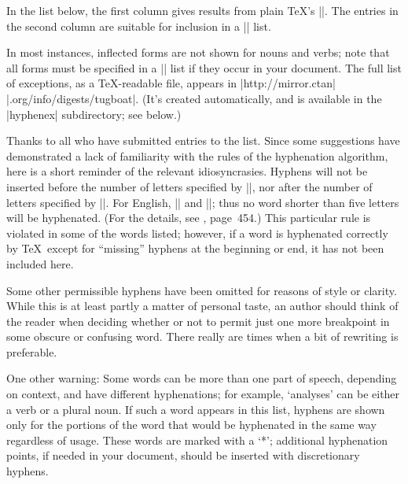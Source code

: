 In the list below, the first column gives results from plain \TeX's
||. The entries in the second column are suitable for
inclusion in a \hbox{||} list.

In most instances, inflected forms are not shown for nouns and verbs;
note that all forms must be specified in a || list
if they occur in your document.  The full list of exceptions, as a
\TeX-readable file, appears in
|http://mirror.ctan| |.org/info/digests/tugboat|.
(It's created automatically, and is available in the
|hyphenex| subdirectory; see below.)

Thanks to all who have submitted entries to the list.  Since some
suggestions have demonstrated a lack of familiarity with the rules of
the hyphenation algorithm, here is a short reminder of the relevant
idiosyncrasies.  Hyphens will not be inserted before the number of
letters specified by |\lefthyphenmin|, nor after the number of letters
specified by |\righthyphenmin|.  For  English, ||
and ||; thus no word shorter than five
letters will be hyphenated.  (For the details, see \TB, page~454.)
This particular rule is violated in some of the words listed; however,
if a word is hyphenated correctly by \TeX\ except for ``missing''
hyphens at the beginning or end, it has not been included here.

Some other permissible hyphens have been omitted
for reasons of style or clarity.  While this is at
least partly a matter of personal taste, an author should think of the
reader when deciding whether or not to permit just one more breakpoint
in some obscure or confusing word.  There really are times when a bit of
rewriting is preferable.
{\hfuzz=2.2pt\par}

One other warning: Some words can be more than one part of speech,
depending on context, and have different hyphenations; for example,
`analyses' can be either a verb or a plural noun.  If such a word appears
in this list, hyphens are shown only for the portions of the word that
would be hyphenated in the same way regardless of usage.  These words
are marked with a `*'; additional hyphenation points, if needed in your
document, should be inserted with discretionary hyphens.

